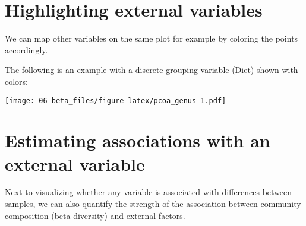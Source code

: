 \documentclass[
  oneside]{book}
\newenvironment{Shaded}{\begin{snugshade}}{\end{snugshade}}
\newcommand{\AttributeTok}[1]{\textcolor[rgb]{0.77,0.63,0.00}{#1}}
\newcommand{\CommentTok}[1]{\textcolor[rgb]{0.56,0.35,0.01}{\textit{#1}}}
\newcommand{\DecValTok}[1]{\textcolor[rgb]{0.00,0.00,0.81}{#1}}
\newcommand{\FunctionTok}[1]{\textcolor[rgb]{0.00,0.00,0.00}{#1}}
\newcommand{\NormalTok}[1]{#1}
\newcommand{\OtherTok}[1]{\textcolor[rgb]{0.56,0.35,0.01}{#1}}
\newcommand{\SpecialCharTok}[1]{\textcolor[rgb]{0.00,0.00,0.00}{#1}}
\newcommand{\StringTok}[1]{\textcolor[rgb]{0.31,0.60,0.02}{#1}}
\begin{document}
\hypertarget{highlighting-external-variables}{%
\section{Highlighting external variables}\label{highlighting-external-variables}}

We can map other variables on the same plot for example by coloring
the points accordingly.

The following is an example with a discrete grouping variable (Diet) shown with colors:

\begin{Shaded}
\end{Shaded}

\texttt{[image: 06-beta\_files/figure-latex/pcoa\_genus-1.pdf]}

\hypertarget{estimating-associations-with-an-external-variable}{%
\section{Estimating associations with an external variable}\label{estimating-associations-with-an-external-variable}}

Next to visualizing whether any variable is associated with
differences between samples, we can also quantify the strength of the
association between community composition (beta diversity) and
external factors.
\end{document}
